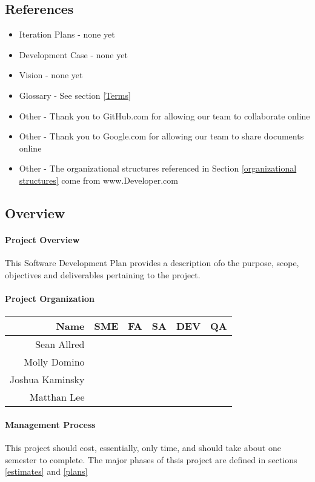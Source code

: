 \documentclass{article}
\newcommand{\role}{\checkmark}
\begin{document}
\subsection{References}
\begin{itemize}
\item Iteration Plans - none yet
\item Development Case - none yet
\item Vision - none yet
\item Glossary - See section \ref{Terms}
\item Other - Thank you to GitHub.com for allowing our team to collaborate online
\item Other - Thank you to Google.com for allowing our team to share documents online
\item Other - The organizational structures referenced in Section \ref{organizational structures} come from www.Developer.com
\end{itemize}
\subsection{Overview}
\paragraph{Project Overview}
This Software Development Plan provides a description ofo the purpose, scope, objectives and deliverables pertaining to the project.
\paragraph{Project Organization}
\begin{tabular}{|r|c|c|c|c|c|}
\hline
Name            & SME   & FA    & SA    & DEV   & QA    \\ \hline
Sean Allred     &       & \role & \role & \role & \role \\ \hline
Molly Domino    & \role &       & \role & \role & \role \\ \hline
Joshua Kaminsky & \role & \role & \role &       & \role \\ \hline
Matthan Lee     & \role & \role &       & \role & \role \\ \hline
\end{tabular}
\paragraph{Management Process} This project should cost, essentially, only time, and should take about one semester to complete. The major phases of thsis project are defined in sections \ref{estimates} and \ref{plans}
\end{document}
